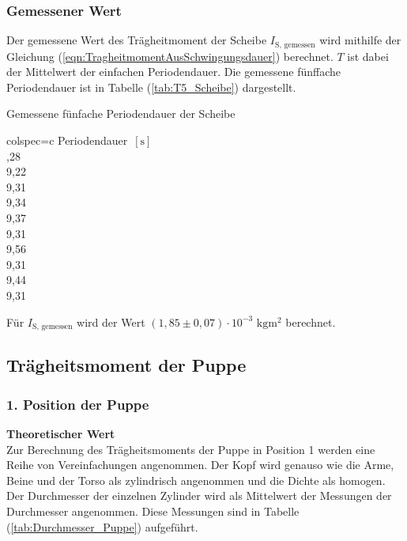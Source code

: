     \subsubsection{Gemessener Wert}
    Der gemessene Wert des Trägheitmoment der Scheibe $I_{\text{S, gemessen}}$ wird mithilfe der Gleichung (\ref{eqn:TragheitmomentAusSchwingungsdauer}) berechnet.
    $T$ ist dabei der Mittelwert der einfachen Periodendauer. Die gemessene fünffache Periodendauer ist in Tabelle (\ref{tab:T5_Scheibe}) dargestellt.
    \begin{table}[H]
      \centering 
      \caption{Gemessene fünfache Periodendauer der Scheibe}
      \label{tab:T5_Scheibe}
      \begin{tblr}{colspec={c}}
          \toprule
          Periodendauer $\,[\unit{\second}]$ \\
          ,28 \\
          9,22 \\
          9,31 \\
          9,34 \\
          9,37 \\
          9,31 \\
          9,56 \\
          9,31 \\
          9,44 \\
          9,31 \\
          \bottomrule
      \end{tblr}
    \end{table}
    Für $I_{\text{S, gemessen}}$ wird der Wert $(1,85 \pm 0,07) \cdot 10^{-3} \,\,\unit{\kilo\gram\meter\squared}$ berechnet. 
     
  
  \subsection{Trägheitsmoment der Puppe}
    \subsubsection{1. Position der Puppe}
      \textbf{Theoretischer Wert}\\
        Zur Berechnung des Trägheitsmoments der Puppe in Position 1 werden eine Reihe von Vereinfachungen angenommen. Der Kopf wird genauso
        wie die Arme, Beine und der Torso als zylindrisch angenommen und die Dichte als homogen. Der Durchmesser der einzelnen Zylinder wird 
        als Mittelwert der Messungen der Durchmesser angenommen. Diese Messungen sind in Tabelle (\ref{tab:Durchmesser_Puppe}) aufgeführt. 

